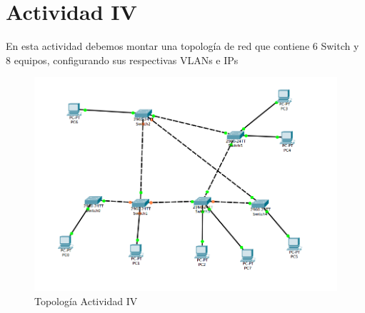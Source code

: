 \documentclass[spanish]{udpreport}
\begin{document}
\section{Actividad IV}

En esta actividad debemos montar una topología de red que contiene 6 Switch y 8 equipos, configurando sus respectivas VLANs e IPs

\begin{figure}[H]
	\label{fig:Figura 2.4}
	\centering
	\includegraphics[scale=.6]{imagenes/A4e.png}
	\caption{Topología Actividad IV}
\end{figure}
\end{document}
